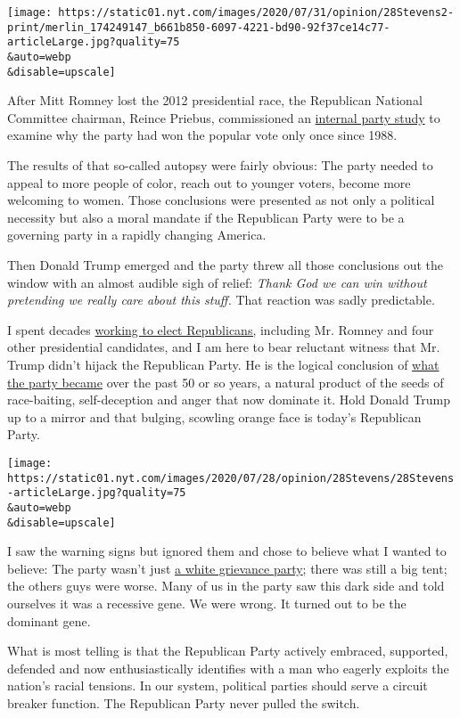 \texttt{[image: https://static01.nyt.com/images/2020/07/31/opinion/28Stevens2-print/merlin\_174249147\_b661b850-6097-4221-bd90-92f37ce14c77-articleLarge.jpg?quality=75\\\&auto=webp\\\&disable=upscale]}

After Mitt Romney lost the 2012 presidential race, the Republican
National Committee chairman, Reince Priebus, commissioned an
\href{https://www.nytimes.com/2013/03/19/us/politics/republicans-plan-overhaul-for-2016-primary-season.html}{internal
party study} to examine why the party had won the popular vote only once
since 1988.

The results of that so-called autopsy were fairly obvious: The party
needed to appeal to more people of color, reach out to younger voters,
become more welcoming to women. Those conclusions were presented as not
only a political necessity but also a moral mandate if the Republican
Party were to be a governing party in a rapidly changing America.

Then Donald Trump emerged and the party threw all those conclusions out
the window with an almost audible sigh of relief: \emph{Thank God we can
win without pretending we really care about this stuff.} That reaction
was sadly predictable.

I spent decades
\href{https://www.nytimes.com/2020/07/16/us/politics/trump-republicans.html}{working
to elect Republicans,} including Mr. Romney and four other presidential
candidates, and I am here to bear reluctant witness that Mr. Trump
didn't hijack the Republican Party. He is the logical conclusion of
\href{https://www.nytimes.com/2020/03/18/opinion/trump-republicans-racism.html}{what
the party became} over the past 50 or so years, a natural product of the
seeds of race-baiting, self-deception and anger that now dominate it.
Hold Donald Trump up to a mirror and that bulging, scowling orange face
is today's Republican Party.

\texttt{[image: https://static01.nyt.com/images/2020/07/28/opinion/28Stevens/28Stevens-articleLarge.jpg?quality=75\\\&auto=webp\\\&disable=upscale]}

I saw the warning signs but ignored them and chose to believe what I
wanted to believe: The party wasn't just
\href{https://www.nytimes.com/2020/03/18/opinion/trump-republicans-racism.html}{a
white grievance party}; there was still a big tent; the others guys were
worse. Many of us in the party saw this dark side and told ourselves it
was a recessive gene. We were wrong. It turned out to be the dominant
gene.

What is most telling is that the Republican Party actively embraced,
supported, defended and now enthusiastically identifies with a man who
eagerly exploits the nation's racial tensions. In our system, political
parties should serve a circuit breaker function. The Republican Party
never pulled the switch.

